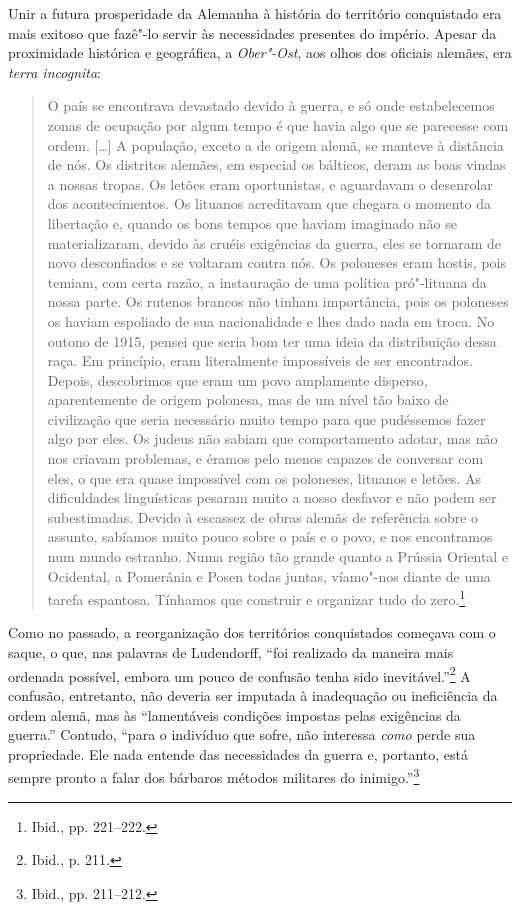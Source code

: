 Unir a futura prosperidade da Alemanha à história do território
conquistado era mais exitoso que fazê"-lo servir às necessidades
presentes do império. Apesar da proximidade histórica e geográfica, a
\textit{Ober"-Ost}, aos olhos dos oficiais alemães, era \textit{terra
incognita}:

\begin{quote}
O país se encontrava devastado devido à guerra, e só onde estabelecemos
zonas de ocupação por algum tempo é que havia algo que se parecesse com
ordem. [\ldots{}] A população, exceto a de origem alemã, se manteve à
distância de nós. Os distritos alemães, em especial os bálticos, deram
as boas vindas a nossas tropas. Os letões eram oportunistas, e
aguardavam o desenrolar dos acontecimentos. Os lituanos acreditavam que
chegara o momento da libertação e, quando os bons tempos que haviam
imaginado não se materializaram, devido às cruéis exigências da guerra,
eles se tornaram de novo desconfiados e se voltaram contra nós. Os
poloneses eram hostis, pois temiam, com certa razão, a instauração de
uma política pró"-lituana da nossa parte. Os rutenos brancos não tinham
importância, pois os poloneses os haviam espoliado de sua nacionalidade
e lhes dado nada em troca. No outono de 1915, pensei que seria bom ter
uma ideia da distribuição dessa raça. Em princípio, eram literalmente
impossíveis de ser encontrados. Depois, descobrimos que eram um povo
amplamente disperso, aparentemente de origem polonesa, mas de um nível
tão baixo de civilização que seria necessário muito tempo para que
pudéssemos fazer algo por eles. Os judeus não sabiam que comportamento
adotar, mas não nos criavam problemas, e éramos pelo menos capazes de
conversar com eles, o que era quase impossível com os poloneses,
lituanos e letões. As dificuldades linguísticas pesaram muito a nosso
desfavor e não podem ser subestimadas. Devido à escassez de obras alemãs
de referência sobre o assunto, sabíamos muito pouco sobre o país e o
povo, e nos encontramos num mundo estranho. Numa região tão grande
quanto a Prússia Oriental e Ocidental, a Pomerânia e Posen todas juntas,
víamo"-nos diante de uma tarefa espantosa. Tínhamos que construir e
organizar tudo do zero.\footnote{Ibid., pp. 221--222.}
\end{quote}

Como no passado, a reorganização dos territórios conquistados começava
com o saque, o que, nas palavras de Ludendorff, ``foi realizado da
maneira mais ordenada possível, embora um pouco de confusão tenha sido
inevitável.''\footnote{Ibid., p. 211.} A confusão, entretanto, não
deveria ser imputada à inadequação ou ineficiência da ordem alemã, mas
às ``lamentáveis condições impostas pelas exigências da guerra.''
Contudo, ``para o indivíduo que sofre, não interessa \textit{como} perde
sua propriedade. Ele nada entende das necessidades da guerra e,
portanto, está sempre pronto a falar dos bárbaros métodos militares do
inimigo.''\footnote{Ibid., pp. 211--212.}


